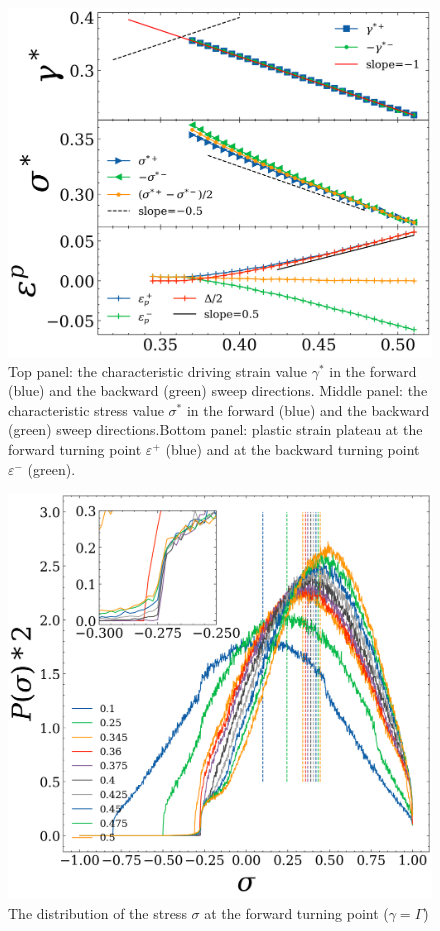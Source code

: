 \documentclass[%
 prl,
 amsmath,amssymb,
%
 reprint,%
]{revtex4-1}
\begin{document}
\begin{figure}[h!]
\includegraphics[width = 1.\columnwidth]{fig_gammastar_sigmastar_epsilonp_vs_Gamma.png}%
\caption{Top panel: the characteristic driving strain value $\gamma^*$ in the forward (blue) and the backward (green) sweep directions. Middle panel: the characteristic stress value $\sigma^*$ in the forward (blue) and the backward (green) sweep directions.Bottom panel: plastic strain plateau at the forward turning point $\varepsilon^+$ (blue) and at the backward turning point $\varepsilon^-$ (green). }
\end{figure}
\begin{figure}[h!]
\includegraphics[width = 1.\columnwidth]{fig_P(sigma)_DepsilonDgamma.png}%
\caption{The distribution of the stress $\sigma$ at the forward turning point ($\gamma=\Gamma$) }
\end{figure}
\end{document}
